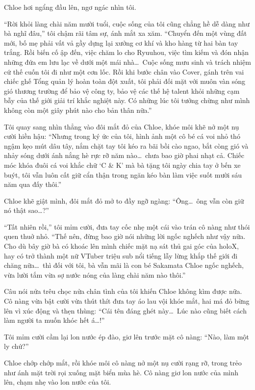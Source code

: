 \documentclass[../main.tex]{subfiles}
\begin{document}
Chloe hơi ngẩng đầu lên, ngơ ngác nhìn tôi.

``Rời khỏi làng chài năm mười tuổi, cuộc sống của tôi cũng chẳng hề dễ dàng như bà nghĩ đâu,'' tôi chậm rãi tâm sự, ánh mắt xa xăm. ``Chuyển đến một vùng đất mới, bố mẹ phải vất vả gầy dựng lại xưởng cơ khí và kho hàng từ hai bàn tay trắng. Rồi biến cố ập đến, việc chăm lo cho Ryuuhou, việc tìm kiếm và đón nhận những đứa em lưu lạc về dưới một mái nhà\dots\ Cuộc sống mưu sinh và trách nhiệm cứ thế cuốn tôi đi như một cơn lốc. Rồi khi bước chân vào Cover, gánh trên vai chiếc ghế Tổng quản lý hoàn toàn đột xuất, tôi phải đối mặt với muôn vàn sóng gió thương trường để bảo vệ công ty, bảo vệ các thế hệ talent khỏi những cạm bẫy của thế giới giải trí khắc nghiệt này. Có những lúc tôi tưởng chừng như mình không còn một giây phút nào cho bản thân nữa.''

Tôi quay sang nhìn thẳng vào đôi mắt đỏ của Chloe, khóe môi khẽ nở một nụ cười hiền hậu: ``Nhưng trong ký ức của tôi, hình ảnh một cô bé cá voi nhỏ thó ngậm kẹo mút dâu tây, nắm chặt tay tôi kéo ra bãi bồi cào ngao, bắt còng gió và nhảy sóng dưới ánh nắng hè rực rỡ năm nào\dots\ chưa bao giờ phai nhạt cả. Chiếc móc khóa đuôi cá voi khắc chữ `C \& K' mà bà tặng tôi ngày chia tay ở bến xe buýt, tôi vẫn luôn cất giữ cẩn thận trong ngăn kéo bàn làm việc suốt mười sáu năm qua đấy thôi.''

Chloe khẽ giật mình, đôi mắt đỏ mở to đầy ngỡ ngàng: ``Ông\dots\ ông vẫn còn giữ nó thật sao\dots?''

``Tất nhiên rồi,'' tôi mỉm cười, đưa tay cốc nhẹ một cái vào trán cô nàng như thói quen thuở nhỏ. ``Thế nên, đừng bao giờ nói những lời ngốc nghếch như vậy nữa. Cho dù bây giờ bà có khoác lên mình chiếc mặt nạ sát thủ gai góc của holoX, hay có trở thành một nữ VTuber triệu sub nổi tiếng lẫy lừng khắp thế giới đi chăng nữa\dots\ thì đối với tôi, bà vẫn mãi là con bé Sakamata Chloe ngốc nghếch, vừa lười tắm vừa sợ nước nóng của làng chài năm nào thôi.''

Câu nói nửa trêu chọc nửa chân tình của tôi khiến Chloe không kìm được nữa. Cô nàng vừa bật cười vừa thút thít đưa tay áo lau vội khóe mắt, hai má đỏ bừng lên vì xúc động và thẹn thùng: ``Cái tên đáng ghét này\dots\ Lúc nào cũng biết cách làm người ta muốn khóc hết á\dots!''

Tôi mỉm cười cầm lại lon nước ép đào, giơ lên trước mặt cô nàng: ``Nào, làm một ly chứ?''

Chloe chớp chớp mắt, rồi khóe môi cô nàng nở một nụ cười rạng rỡ, trong trẻo như ánh mặt trời rọi xuống mặt biển mùa hè. Cô nàng giơ lon nước của mình lên, chạm nhẹ vào lon nước của tôi.
\end{document}
